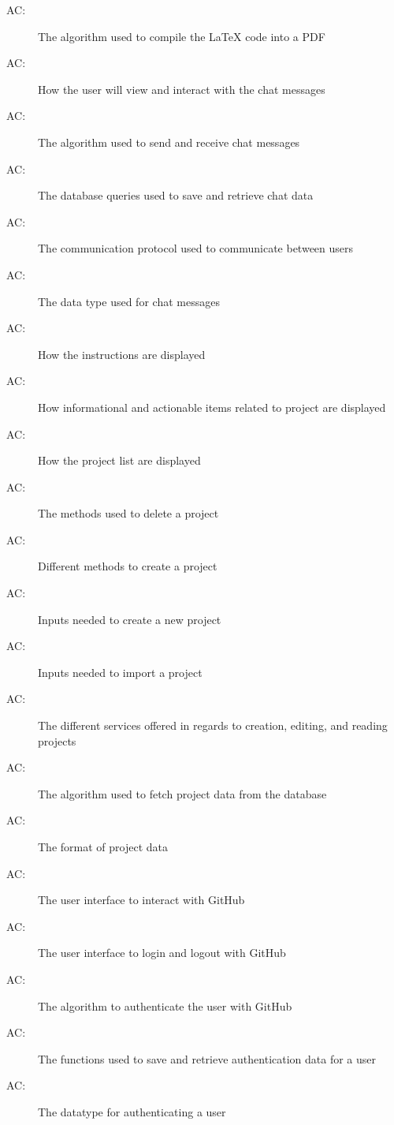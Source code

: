 \documentclass[12pt, titlepage]{article}
\newcounter{acnum}
\newcommand{\actheacnum}{AC\theacnum}
\begin{document}
\begin{description}
		\item[ \actheacnum \label{ac17}:]  The algorithm used to compile the LaTeX code into a PDF
		\item[ \actheacnum \label{ac18}:]  How the user will view and interact with the chat messages
		\item[ \actheacnum \label{ac19}:]  The algorithm used to send and receive chat messages
		\item[ \actheacnum \label{ac20}:]  The database queries used to save and retrieve chat data
		\item[ \actheacnum \label{ac21}:]  The communication protocol used to communicate between users
		\item[ \actheacnum \label{ac22}:]  The data type used for chat messages
		\item[ \actheacnum \label{ac23}:]  How the instructions are displayed
		\item[ \actheacnum \label{ac24}:]  How informational and actionable items related to project are displayed
		\item[ \actheacnum \label{ac25}:]  How the project list are displayed
		\item[ \actheacnum \label{ac26}:]  The methods used to delete a project
		\item[ \actheacnum \label{ac27}:]  Different methods to create a project
		\item[ \actheacnum \label{ac28}:]  Inputs needed to create a new project
		\item[ \actheacnum \label{ac29}:]  Inputs needed to import a project
		\item[ \actheacnum \label{ac30}:]  The different services offered in regards to creation, editing, and reading projects
		\item[ \actheacnum \label{ac31}:]  The algorithm used to fetch project data from the database
		\item[ \actheacnum \label{ac32}:]  The format of project data
		\item[ \actheacnum \label{ac33}:]  The user interface to interact with GitHub
		\item[ \actheacnum \label{ac34}:]  The user interface to login and logout with GitHub
		\item[ \actheacnum \label{ac35}:]  The algorithm to authenticate the user with GitHub
		\item[ \actheacnum \label{ac36}:]  The functions used to save and retrieve authentication data for a user
		\item[ \actheacnum \label{ac37}:]  The datatype for authenticating a user
		

\end{description}
\end{document}

